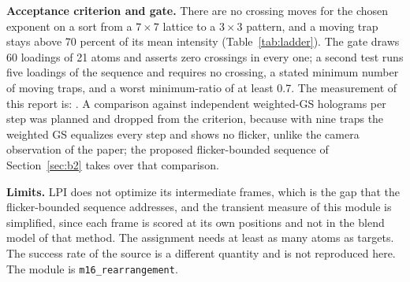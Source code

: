 \textbf{Acceptance criterion and gate.} There are no crossing moves for the chosen exponent on a sort from a $7\times7$ lattice to a $3\times3$ pattern, and a moving trap stays above 70 percent of its mean intensity (Table~\ref{tab:ladder}). The gate draws 60 loadings of 21 atoms and asserts zero crossings in every one; a second test runs five loadings of the sequence and requires no crossing, a stated minimum number of moving traps, and a worst minimum-ratio of at least 0.7. The measurement of this report is: . A comparison against independent weighted-GS holograms per step was planned and dropped from the criterion, because with nine traps the weighted GS equalizes every step and shows no flicker, unlike the camera observation of the paper; the proposed flicker-bounded sequence of Section~\ref{sec:b2} takes over that comparison.

\textbf{Limits.} LPI does not optimize its intermediate frames, which is the gap that the flicker-bounded sequence addresses, and the transient measure of this module is simplified, since each frame is scored at its own positions and not in the blend model of that method. The assignment needs at least as many atoms as targets. The success rate of the source is a different quantity and is not reproduced here. The module is \texttt{m16\_rearrangement}.
